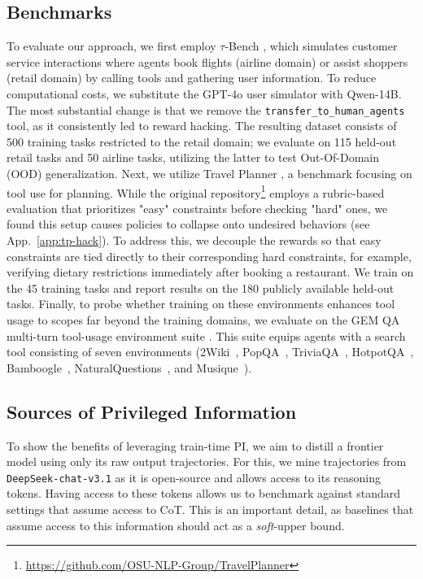 \documentclass[]{servicenow} %
\begin{document}
\subsection{Benchmarks}
To evaluate our approach, we first employ $\tau$-Bench \citep{yao2024taubenchbenchmarktoolagentuserinteraction}, which simulates customer service interactions where agents book flights (airline domain) or assist shoppers (retail domain) by calling tools and gathering user information. To reduce computational costs, we substitute the GPT-4o user simulator with Qwen-14B. The most substantial change is that we remove the \texttt{transfer\_to\_human\_agents} tool, as it consistently led to reward hacking. The resulting dataset consists of 500 training tasks restricted to the retail domain; we evaluate on 115 held-out retail tasks and 50 airline tasks, utilizing the latter to test Out-Of-Domain (OOD) generalization. Next, we utilize Travel Planner \citep{xie2024travelplannerbenchmarkrealworldplanning}, a benchmark focusing on tool use for planning. While the original repository\footnote{\hyperlink{https://github.com/OSU-NLP-Group/TravelPlanner}{https://github.com/OSU-NLP-Group/TravelPlanner}} employs a rubric-based evaluation that prioritizes "easy" constraints before checking "hard" ones, we found this setup causes policies to collapse onto undesired behaviors (see App.~\ref{app:tp-hack}). To address this, we decouple the rewards so that easy constraints are tied directly to their corresponding hard constraints, for example, verifying dietary restrictions immediately after booking a restaurant. We train on the 45 training tasks and report results on the 180 publicly available held-out tasks. Finally, to probe whether training on these environments enhances tool usage to scopes far beyond the training domains, we evaluate on the GEM QA multi-turn tool-usage environment suite \citep{liu2025gemgymagenticllms}. This suite equips agents with a search tool consisting of seven environments (2Wiki~\citep{xanh2020_2wikimultihop}, PopQA~\citep{mallen2023llm_memorization}, TriviaQA~\citep{joshi2017triviaqalargescaledistantly}, HotpotQA~\citep{hotpotqa}, Bamboogle~\citep{bamboogle}, NaturalQuestions~\citep{naturalquestions}, and Musique~\citep{trivedi2022musiquemultihopquestionssinglehop}).

\subsection{Sources of Privileged Information}
\label{ssuc:priv_sources}
To show the benefits of leveraging train-time PI, we aim to distill a frontier model using only its raw output trajectories. For this, we mine trajectories from \texttt{DeepSeek-chat-v3.1} as it is open-source and allows access to its reasoning tokens. Having access to these tokens allows us to benchmark against standard settings that assume access to CoT. This is an important detail, as baselines that assume access to this information should act as a \textit{soft}-upper bound.
\end{document}
